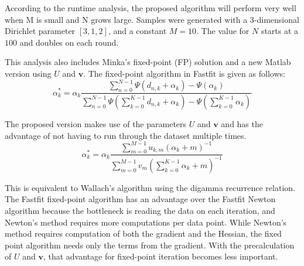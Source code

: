 \documentclass[twoside]{article}
\begin{document}
According to the runtime analysis, the proposed algorithm will perform very well when M is small and N grows large.  Samples were generated with a 3-dimensional Dirichlet parameter $[3,1,2]$, and a constant $M = 10$.  The value for $N$ starts at a $100$ and doubles on each round.

This analysis also includes Minka's fixed-point (FP) solution and a new Matlab version using $U$ and $\mathbf{v}$.  The fixed-point algorithm in Fastfit is given as follows:
\begin{equation}
\alpha_k^{*}= \alpha_k\frac{\sum_{n=0}^{N-1}\Psi(d_{n,k}+\alpha_k)-\Psi(\alpha_k)}{\sum_{n=0}^{N-1}\Psi(\sum_{k=0}^{K-1}d_{n,k}+\alpha_k)-\Psi(\sum_{k=0}^{K-1}\alpha_k)}
\end{equation}

The proposed version makes use of the parameters $U$ and $\mathbf{v}$ and has the advantage of not having to run through the dataset multiple times.
\begin{equation}
\alpha_k^{*}= \alpha_k\frac{\sum_{m=0}^{M-1}u_{k,m}(\alpha_k+m)^{-1}}{\sum_{m=0}^{M-1}v_m(\sum_{k=0}^{K-1}\alpha_k+m)^{-1}}
\end{equation}

This is equivalent to Wallach's algorithm using the digamma recurrence relation\cite{wallach}. The Fastfit fixed-point algorithm has an advantage over the Fastfit Newton algorithm because the bottleneck is reading the data on each iteration, and Newton's method requires more computations per data point.  While Newton's method requires computation of both the gradient and the Hessian, the fixed point algorithm needs only the terms from the gradient.  With the precalculation of $U$ and $\mathbf{v}$, that advantage for fixed-point iteration becomes less important.
\end{document}
